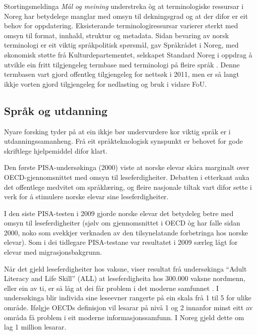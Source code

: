 \begin{multicols}{2}
Stortingsmeldinga \textit{Mål og meining} understreka òg at terminologiske ressursar i Noreg har betydelege manglar med omsyn til dekningsgrad og at der difor er eit behov for oppdatering. Eksisterande terminologiressursar varierer sterkt med omsyn til format, innhald, struktur og metadata. 
Sidan bevaring av norsk terminologi er eit viktig språkpolitisk spørsmål, gav Språkrådet i Noreg, med økonomisk støtte frå Kulturdepartementet, selskapet Standard Noreg i oppdrag å utvikle ein fritt tilgjengeleg termbase med terminologi på fleire språk \cite{drosdal2010}. 
Denne termbasen vart gjord offentleg tilgjengeleg for nettsøk i 2011, men er så langt ikkje vorten gjord tilgjengeleg for nedlasting og bruk i vidare FoU. 
 
\subsection{Språk og utdanning}

Nyare forsking tyder på at ein ikkje bør undervurdere kor viktig språk er i utdanningssamanheng. 
Frå eit språkteknologisk synspunkt er behovet for gode skriftlege hjelpemiddel difor klart. 

Den første PISA-undersøkinga (2000) viste at norske elevar skåra marginalt over OECD-gjennomsnittet med omsyn til leseferdigheiter. 
Debatten i etterkant auka det offentlege medvitet om språklæring, og fleire nasjonale tiltak vart difor sette i verk for å stimulere norske elevar sine leseferdigheiter. 

I den siste PISA-testen i 2009  \cite{pisa2009eng} gjorde norske elevar det betydeleg betre med omsyn til leseferdigheiter (sjølv om gjennomsnittet i OECD òg har falle sidan 2000, noko som svekkjer verknaden av den tilsynelatande forbetringa hos norske elevar). 
Som i dei tidlegare PISA-testane var resultatet i 2009 særleg lågt for elevar med migrasjonsbakgrunn. 


Når det gjeld leseferdigheiter hos vaksne, viser resultat frå undersøkinga ``Adult Literacy and Life Skill'' (ALL) at leseferdigheita hos 300.000 vaksne nordmenn, eller ein av ti, er så låg at dei får problem i det moderne samfunnet  \cite{gab:2005}. 
I undersøkinga blir individa sine leseevner rangerte på ein skala frå 1 til 5 for ulike område. Ifølgje OECDs definisjon vil lesarar på nivå 1 og 2 innanfor minst eitt av områda få problem i eit moderne informasjonssamfunn. I Noreg gjeld dette om lag 1 million lesarar. 


\end{multicols}
